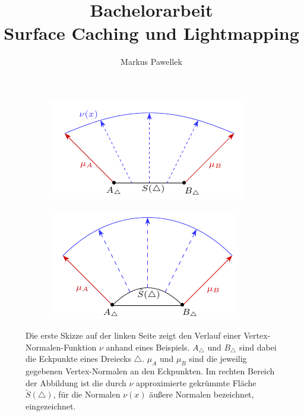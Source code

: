 

\title{Bachelorarbeit \\ Surface Caching und Lightmapping}
\author{Markus Pawellek}
\newcommand{\email}{markuspawellek@gmail.com}




	\articletitle

	\begin{figure}[h]
		\begin{subfigure}[b]{0.5\textwidth}
			\center
			\includegraphics{gg_fig/scheme_normal-function_1.pdf}
		\end{subfigure}
		\begin{subfigure}[b]{0.5\textwidth}
			\center
			\includegraphics{gg_fig/scheme_normal-function_2.pdf}
		\end{subfigure}
		\caption{Die erste Skizze auf der linken Seite zeigt den Verlauf einer Vertex-Normalen-Funktion $\nu$ anhand eines Beispiels. $A_\triangle$ und $B_\triangle$ sind dabei die Eckpunkte eines Dreiecks $\triangle$. $\mu_A$ und $\mu_B$ sind die jeweilig gegebenen Vertex-Normalen an den Eckpunkten. Im rechten Bereich der Abbildung ist die durch $\nu$ approximierte gekrümmte Fläche $\tilde{S}(\triangle)$, für die Normalen $\nu(x)$ äußere Normalen bezeichnet, eingezeichnet.}
	\end{figure}


